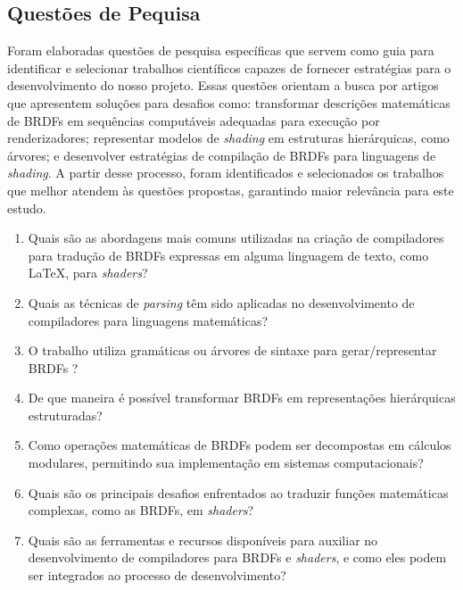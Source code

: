 %
%


%








\subsection{Questões de Pequisa}  \label{questoes-pesquisa}


Foram elaboradas questões de pesquisa específicas que servem como guia para identificar e selecionar trabalhos científicos capazes de fornecer estratégias para o desenvolvimento do nosso projeto. Essas questões orientam a busca por artigos que apresentem soluções para desafios como: transformar descrições matemáticas de BRDFs em sequências computáveis adequadas para execução por renderizadores; representar modelos de \textit{shading} em estruturas hierárquicas, como árvores; e desenvolver estratégias de compilação de BRDFs para linguagens de \textit{shading}. A partir desse processo, foram identificados e selecionados os trabalhos que melhor atendem às questões propostas, garantindo maior relevância para este estudo.


\begin{enumerate}
  \item Quais são as abordagens mais comuns utilizadas na criação de compiladores para tradução de BRDFs expressas em alguma linguagem de texto, como \LaTeX{}, para \textit{shaders}?

  \item Quais as técnicas de \textit{parsing} têm sido aplicadas no desenvolvimento de compiladores para linguagens matemáticas?

  \item O trabalho utiliza gramáticas ou árvores de sintaxe para gerar/representar BRDFs ?

  \item De que maneira é possível transformar BRDFs em representações hierárquicas estruturadas?

  \item Como operações matemáticas de BRDFs podem ser decompostas em cálculos modulares, permitindo sua implementação em sistemas computacionais?

 \item Quais são os principais desafios enfrentados ao traduzir funções matemáticas complexas, como as BRDFs, em \textit{shaders}?

 \item Quais são as ferramentas e recursos disponíveis para auxiliar no desenvolvimento de compiladores para BRDFs e \textit{shaders}, e como eles podem ser integrados ao processo de desenvolvimento?

\end{enumerate}




